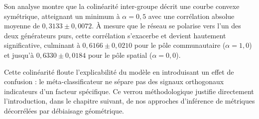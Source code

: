 Son analyse montre que la colinéarité inter-groupe décrit une courbe convexe symétrique, atteignant un minimum à $\alpha = 0,5$ avec une corrélation absolue moyenne de $0,3133 \pm 0,0072$. À mesure que le réseau se polarise vers l'un des deux générateurs purs, cette corrélation s'exacerbe et devient hautement significative, culminant à $0,6166 \pm 0,0210$ pour le pôle communautaire ($\alpha = 1,0$) et jusqu'à $0,6330 \pm 0,0184$ pour le pôle spatial ($\alpha = 0,0$). 

Cette colinéarité floute l'explicabilité du modèle en introduisant un effet de confusion : le méta-classificateur ne sépare pas des signaux orthogonaux indicateurs d'un facteur spécifique. Ce verrou méthodologique justifie directement l'introduction, dans le chapitre suivant, de nos approches d'inférence de métriques décorrélées par débiaisage géométrique.

